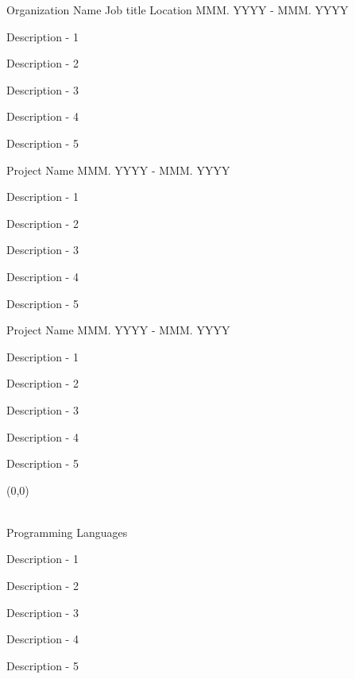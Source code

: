 \documentclass[11pt, a4paper]{resume-lab}
\begin{document}
\begin{Parallel}[v]{0.265\textwidth}{0.66\textwidth}
{\begin{cvletter}
\cventry
    {Organization Name} %
    {Job title} %
    {Location} %
    {MMM. YYYY - MMM. YYYY} %
    {
      \begin{cvitems} %
        \item {Description - 1}
        \item {Description - 2}
        \item {Description - 3}
        \item {Description - 4}
        \item {Description - 5}
      \end{cvitems}
    }
\cvhonor
    {Project Name} %
    {MMM. YYYY - MMM. YYYY} %
    {
      \begin{cvitems} %
        \item {Description - 1}
        \item {Description - 2}
        \item {Description - 3}
        \item {Description - 4}
        \item {Description - 5}
      \end{cvitems}
    }

\cvhonor
    {Project Name} %
    {MMM. YYYY - MMM. YYYY} %
    {
      \begin{cvitems} %
        \item {Description - 1}
        \item {Description - 2}
        \item {Description - 3}
        \item {Description - 4}
        \item {Description - 5}
      \end{cvitems}
    }

\end{cvletter}

\begin{textblock}{2}(0,0)
	
	\vspace{5mm}\\
	\skillsection
	{Programming Languages}
	{
		\begin{skillitems} %
			\item {Description - 1}
			\item {Description - 2}
			\item {Description - 3}
			\item {Description - 4}
			\item {Description - 5}
		\end{skillitems}
	}
	

\end{textblock}}
\end{Parallel}
\end{document}
